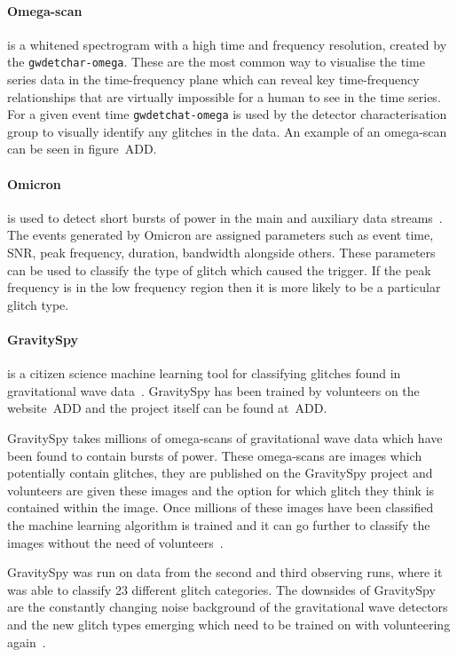 \paragraph{Omega-scan}

is a whitened spectrogram with a high time and frequency resolution, created by the \verb|gwdetchar-omega|. These are the most common way to visualise the time series data in the time-frequency plane which can reveal key time-frequency relationships that are virtually impossible for a human to see in the time series. For a given event time \verb|gwdetchat-omega| is used by the detector characterisation group to visually identify any glitches in the data. An example of an omega-scan can be seen in figure~ADD.
%

\paragraph{Omicron}

is used to detect short bursts of power in the main and auxiliary data streams~\cite{iDQ:2020}. The events generated by Omicron are assigned parameters such as event time, SNR, peak frequency, duration, bandwidth alongside others. These parameters can be used to classify the type of glitch which caused the trigger. If the peak frequency is in the low frequency region then it is more likely to be a particular glitch type.

\paragraph{GravitySpy}

is a citizen science machine learning tool for classifying glitches found in gravitational wave data~\cite{gravityspy:2017}. GravitySpy has been trained by volunteers on the website~ADD and the project itself can be found at~ADD.

GravitySpy takes millions of omega-scans of gravitational wave data which have been found to contain bursts of power. These omega-scans are images which potentially contain glitches, they are published on the GravitySpy project and volunteers are given these images and the option for which glitch they think is contained within the image. Once millions of these images have been classified the machine learning algorithm is trained and it can go further to classify the images without the need of volunteers~\cite{gravityspy:2021}.

GravitySpy was run on data from the second and third observing runs, where it was able to classify 23 different glitch categories. The downsides of GravitySpy are the constantly changing noise background of the gravitational wave detectors and the new glitch types emerging which need to be trained on with volunteering again~\cite{gravityspy:2023}.

